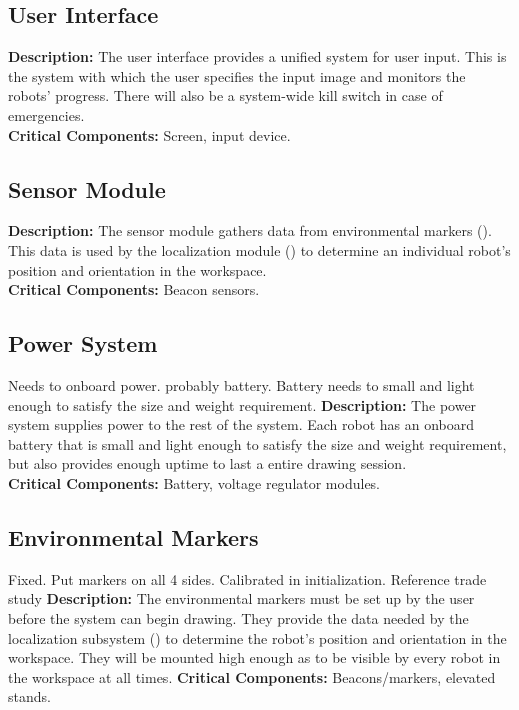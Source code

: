 \subsection{User Interface}
\label{sec:subsystem_ui}
\textbf{Description:} The user interface provides a unified system for user input. This is the system with which the user specifies the input image and monitors the robots' progress. There will also be a system-wide kill switch in case of emergencies.\\
\textbf{Critical Components:} Screen, input device.\\

\subsection{Sensor Module}
\label{sec:subsystem_sensors}
\textbf{Description:} The sensor module gathers data from environmental markers (). This data is used by the localization module () to determine an individual robot's position and orientation in the workspace.\\
\textbf{Critical Components:} Beacon sensors.\\

\subsection{Power System}
\label{sec:subsystem_power}
Needs to onboard power. probably battery. Battery needs to small and light enough to satisfy the size and weight requirement.
\textbf{Description:} The power system supplies power to the rest of the system. Each robot has an onboard battery that is small and light enough to satisfy the size and weight requirement, but also provides enough uptime to last a entire drawing session.\\
\textbf{Critical Components:} Battery, voltage regulator modules.\\

\subsection{Environmental Markers}
\label{sec:subsystem_markers}
Fixed. Put markers on all 4 sides. Calibrated in initialization. Reference trade study
\textbf{Description:} The environmental markers must be set up by the user before the system can begin drawing. They provide the data needed by the localization subsystem () to determine the robot's position and orientation in the workspace. They will be mounted high enough as to be visible by every robot in the workspace at all times.
\textbf{Critical Components:} Beacons/markers, elevated stands.